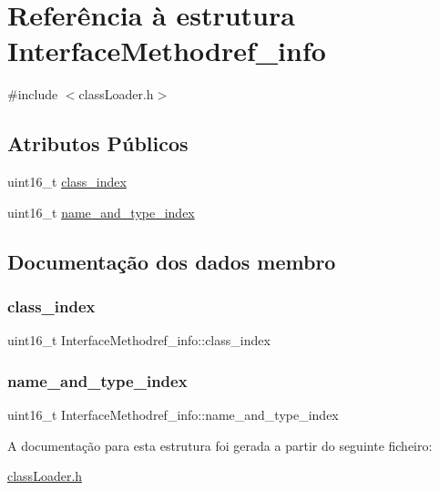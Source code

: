 \hypertarget{struct_interface_methodref__info}{}\section{Referência à estrutura Interface\+Methodref\+\_\+info}
\label{struct_interface_methodref__info}


{\ttfamily \#include $<$class\+Loader.\+h$>$}

\subsection*{Atributos Públicos}
\begin{DoxyCompactItemize}
\item 
uint16\+\_\+t \hyperlink{struct_interface_methodref__info_a10bc75ea623f777737b47ea3cdac4513}{class\+\_\+index}
\item 
uint16\+\_\+t \hyperlink{struct_interface_methodref__info_abab036091a0427273589eac9211026c5}{name\+\_\+and\+\_\+type\+\_\+index}
\end{DoxyCompactItemize}


\subsection{Documentação dos dados membro}
\hypertarget{struct_interface_methodref__info_a10bc75ea623f777737b47ea3cdac4513}{}\label{struct_interface_methodref__info_a10bc75ea623f777737b47ea3cdac4513} 
\subsubsection{\texorpdfstring{class\+\_\+index}{class\_index}}
{\footnotesize\ttfamily uint16\+\_\+t Interface\+Methodref\+\_\+info\+::class\+\_\+index}

\hypertarget{struct_interface_methodref__info_abab036091a0427273589eac9211026c5}{}\label{struct_interface_methodref__info_abab036091a0427273589eac9211026c5} 
\subsubsection{\texorpdfstring{name\+\_\+and\+\_\+type\+\_\+index}{name\_and\_type\_index}}
{\footnotesize\ttfamily uint16\+\_\+t Interface\+Methodref\+\_\+info\+::name\+\_\+and\+\_\+type\+\_\+index}



A documentação para esta estrutura foi gerada a partir do seguinte ficheiro\+:\begin{DoxyCompactItemize}
\item 
\hyperlink{class_loader_8h}{class\+Loader.\+h}\end{DoxyCompactItemize}
